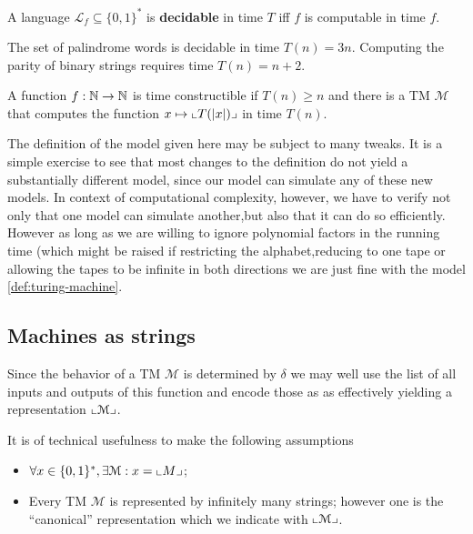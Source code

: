 \begin{definition}
	A language \(\mathcal{L}_f \subseteq \{0,1\}^*\) is \textbf{decidable} in time $T$ iff $f$ is computable in time $f$.
	\label{def:deciable-language}
\end{definition}

\begin{eg}
	The set of palindrome words is decidable in time $T(n) = 3n$. Computing the parity of binary strings requires time $T(n) = n+2$.
\end{eg}

\begin{definition}
	A function $f : \mathbb{N} \to \mathbb{N}$ is time constructible if $T(n) \ge n$ and there is a TM $\mathcal{M}$ that computes the function $x \mapsto \llcorner T(\left \lvert x \right \rvert) \lrcorner$ in time $T(n)$.
\end{definition}

\begin{remark}
	The definition of the model given here may be subject to many tweaks.
	It is a simple exercise to see that most changes to the definition do not yield a substantially
	different model, since our model can simulate any of these new models. In context of
	computational complexity, however, we have to verify not only that one model can
	simulate another,but also that it can do so efficiently.
	However as long as we are willing to ignore polynomial factors in the running time (which might be raised if restricting the alphabet,reducing to one tape or allowing the tapes to be infinite in both directions
	we are just fine with the model \ref{def:turing-machine}.
\end{remark}
\subsection{Machines as strings}

Since the behavior of a TM $\mathcal{M}$ is determined by $\delta$ we may well use the list of all inputs and outputs of this function and encode those as as \binstrings effectively yielding a representation $\llcorner \mathcal{M} \lrcorner$.

It is of technical usefulness to make the following assumptions
\begin{itemize}
	\item $\forall x \in \{ 0,1 \}^* , \exists \mathcal{M} : x = \llcorner M \lrcorner$;
	\item Every TM $\mathcal{M}$ is represented by infinitely many strings; however one is the ``canonical'' representation which we indicate with $\llcorner \mathcal{M} \lrcorner$.
\end{itemize}

